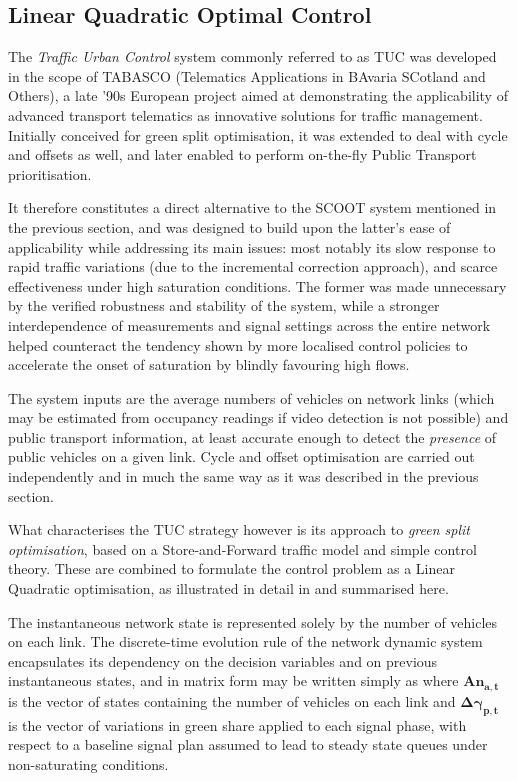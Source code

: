 \subsection{Linear Quadratic Optimal Control}
The \emph{Traffic Urban Control} system commonly referred to as TUC was developed in the scope of TABASCO (Telematics Applications in BAvaria SCotland and Others), a late '90s European project aimed at demonstrating the applicability of advanced transport telematics as innovative solutions for traffic management. Initially conceived for green split optimisation, it was extended to deal with cycle and offsets as well, and later enabled to perform on-the-fly Public Transport prioritisation.

It therefore constitutes a direct alternative to the SCOOT system mentioned in the previous section, and was designed to build upon the latter’s ease of applicability while addressing its main issues: most notably its slow response to rapid traffic variations (due to the incremental correction approach), and scarce effectiveness under high saturation conditions. The former was made unnecessary by the verified robustness and stability of the system, while a stronger interdependence of measurements and signal settings across the entire network helped counteract the tendency shown by more localised control policies to accelerate the onset of saturation by blindly favouring high flows.

The system inputs are the average numbers of vehicles on network links (which may be estimated from occupancy readings if video detection is not possible) and public transport information, at least accurate enough to detect the \emph{presence} of public vehicles on a given link. Cycle and offset optimisation are carried out independently and in much the same way as it was described in the previous section.

What characterises the TUC strategy however is its approach to \emph{green split optimisation}, based on a Store-and-Forward traffic model \citep{aboudolas2009store} and simple control theory.
These are combined to formulate the control problem as a Linear Quadratic optimisation, as illustrated in detail in \citep{diakaki2002multivariable} and summarised here.

The instantaneous network state is represented solely by the number of vehicles on each link. The discrete-time evolution rule of the network dynamic system encapsulates its dependency on the decision variables and on previous instantaneous states, and in matrix form may be written simply as
where $\mathbf{A n_{a,t}}$ is the vector of states containing the number of vehicles on each link and $\mathbf{\Delta \gamma_{p,t}}$ is the
vector of variations in green share applied to each signal phase, with respect to a baseline
signal plan assumed to lead to steady state queues under non-saturating conditions.

